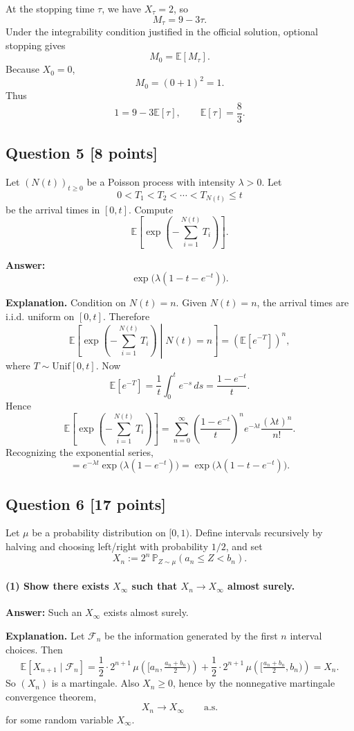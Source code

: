 \documentclass[11pt]{article}
\theoremstyle{definition}
\begin{document}
At the stopping time $\tau$, we have $X_{\tau}=2$, so
\[
 M_{\tau}=9-3\tau.
\]
Under the integrability condition justified in the official solution, optional stopping gives
\[
 M_0=\mathbb E[M_{\tau}].
\]
Because $X_0=0$,
\[
 M_0=(0+1)^2=1.
\]
Thus
\[
 1 = 9-3\mathbb E[\tau],
\qquad
 \mathbb E[\tau]=\frac83.
\]

\subsection*{Question 5 \hfill [8 points]}
Let $(N(t))_{t\ge 0}$ be a Poisson process with intensity $\lambda>0$. Let
\[
0<T_1<T_2<\cdots<T_{N(t)}\le t
\]
be the arrival times in $[0,t]$. Compute
\[
\mathbb E\left[\exp\left(-\sum_{i=1}^{N(t)} T_i\right)\right].
\]

\textbf{Answer:}
\[
\exp\bigl(\lambda(1-t-e^{-t})\bigr).
\]

\textbf{Explanation.} Condition on $N(t)=n$. Given $N(t)=n$, the arrival times are i.i.d. uniform on $[0,t]$. Therefore
\[
\mathbb E\left[\exp\left(-\sum_{i=1}^{N(t)} T_i\right)\middle|N(t)=n\right]
=
\left(\mathbb E[e^{-T}]\right)^n,
\]
where $T\sim \mathrm{Unif}[0,t]$. Now
\[
\mathbb E[e^{-T}] = \frac1t\int_0^t e^{-s}\,ds = \frac{1-e^{-t}}{t}.
\]
Hence
\[
\mathbb E\left[\exp\left(-\sum_{i=1}^{N(t)} T_i\right)\right]
=
\sum_{n=0}^{\infty}
\left(\frac{1-e^{-t}}{t}\right)^n
 e^{-\lambda t}\frac{(\lambda t)^n}{n!}.
\]
Recognizing the exponential series,
\[
= e^{-\lambda t}\exp\bigl(\lambda(1-e^{-t})\bigr)
= \exp\bigl(\lambda(1-t-e^{-t})\bigr).
\]

\subsection*{Question 6 \hfill [17 points]}
Let $\mu$ be a probability distribution on $[0,1)$. Define intervals recursively by halving and choosing left/right with probability $1/2$, and set
\[
X_n := 2^n\,\mathbb P_{Z\sim\mu}(a_n\le Z<b_n).
\]

\paragraph{(1) Show there exists $X_\infty$ such that $X_n\to X_\infty$ almost surely.}

\textbf{Answer:} Such an $X_\infty$ exists almost surely.

\textbf{Explanation.} Let $\mathcal F_n$ be the information generated by the first $n$ interval choices. Then
\[
\mathbb E[X_{n+1}\mid \mathcal F_n]
=
\frac12\cdot 2^{n+1}\,\mu\!\left([a_n,\tfrac{a_n+b_n}{2})\right)
+
\frac12\cdot 2^{n+1}\,\mu\!\left([\tfrac{a_n+b_n}{2},b_n)\right)
= X_n.
\]
So $(X_n)$ is a martingale. Also $X_n\ge 0$, hence by the nonnegative martingale convergence theorem,
\[
X_n\to X_\infty \qquad \text{a.s.}
\]
for some random variable $X_\infty$.
\end{document}
